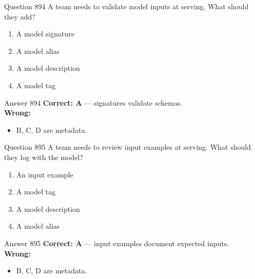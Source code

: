 \documentclass[aspectratio=169,11pt]{beamer}
\begin{document}
	\begin{frame}{Question 894}
		A team needs to validate model inputs at serving. What should they add?
		\begin{enumerate}[label=\Alph*.]
			\item A model signature
			\item A model alias
			\item A model description
			\item A model tag
		\end{enumerate}
	\end{frame}
	\begin{frame}{Answer 894}
		\textbf{Correct: A} --- signatures validate schemas.\\
		\vspace{0.5em}
		\textbf{Wrong:}
		\begin{itemize}
			\item B, C, D are metadata.
		\end{itemize}
	\end{frame}
	
	\begin{frame}{Question 895}
		A team needs to review input examples at serving. What should they log with the model?
		\begin{enumerate}[label=\Alph*.]
			\item An input example
			\item A model tag
			\item A model description
			\item A model alias
		\end{enumerate}
	\end{frame}
	\begin{frame}{Answer 895}
		\textbf{Correct: A} --- input examples document expected inputs.\\
		\vspace{0.5em}
		\textbf{Wrong:}
		\begin{itemize}
			\item B, C, D are metadata.
		\end{itemize}
	\end{frame}
	
\end{document}
